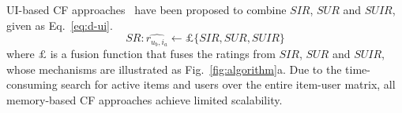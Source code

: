 UI-based CF approaches~\cite{Ma2007@SIGIR,wangjun:CF@2006} have been
proposed to combine $SIR$, $SUR$ and $SUIR$, given as
Eq.~\ref{eq:d-ui}.
\begin{equation}\label{eq:d-ui}
  SR: \widehat{r_{u_b, i_a}} \longleftarrow \pounds \{SIR, SUR, SUIR\}
\end{equation}
where $\pounds$ is a fusion function that fuses the ratings from $SIR$,
$SUR$ and $SUIR$, whose mechanisms are illustrated as
Fig.~\ref{fig:algorithm}a. Due to the time-consuming search for active
items and users over the entire item-user matrix, all memory-based CF
approaches achieve limited scalability.
